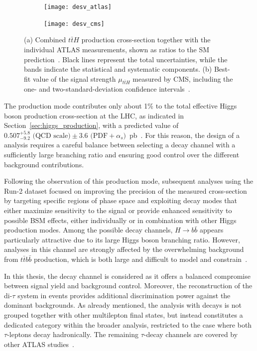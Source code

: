 \begin{figure}[htbp]
    \centering
    \begin{subfigure}[b]{0.48\textwidth}
        \texttt{[image: desv\_atlas]}
        \caption{}
    \end{subfigure}
    \hfill
    \begin{subfigure}[b]{0.48\textwidth}
        \texttt{[image: desv\_cms]}
        \caption{}
    \end{subfigure}
    \hfill
    \caption{(a) Combined $t\bar{t}H$ production cross-section together with the individual ATLAS measurements, shown as ratios to the SM prediction~\cite{ATLAS:2018mme}. Black lines represent the total uncertainties, while the bands indicate the statistical and systematic components. (b) Best-fit value of the signal strength $\mu_{t\bar{t}H}$ measured by CMS, including the one- and two-standard-deviation confidence intervals~\cite{CMS:2018uxb}.}
    \label{fig:tth_obs}
  \end{figure}

  The \ttH production mode contributes only about 1\% to the total effective Higgs boson production cross-section at the LHC, as indicated in Section~\ref{sec:higgs_production}, with a predicted value of $0.507^{+5.8}_{-9.2} \text{ (QCD scale)} \pm 3.6 \text{ (PDF}+\alpha_{s})$~pb~\cite{https://doi.org/10.23731/cyrm-2017-002}. For this reason, the design of a \ttH analysis requires a careful balance between selecting a decay channel with a sufficiently large branching ratio and ensuring good control over the different background contributions.  

  Following the observation of this production mode, subsequent analyses using the Run-2 dataset focused on improving the precision of the measured cross-section by targeting specific regions of phase space and exploiting decay modes that either maximize sensitivity to the signal or provide enhanced sensitivity to possible BSM effects, either individually or in combination with other Higgs production modes. Among the possible decay channels, $H \to b\bar{b}$ appears particularly attractive due to its large Higgs boson branching ratio. However, \ttH analyses in this channel are strongly affected by the overwhelming background from $t\bar{t}b\bar{b}$ production, which is both large and difficult to model and constrain~\cite{Aad:2904447}.  
  
  In this thesis, the \htautau decay channel is considered as it offers a balanced compromise between signal yield and background control. Moreover, the reconstruction of the di-$\tau$ system in \htautau events provides additional discrimination power against the dominant backgrounds. As already mentioned, the \ttH analysis with \htautau decays is not grouped together with other multilepton final states, but instead constitutes a dedicated category within the broader \htautau analysis, restricted to the case where both $\tau$-leptons decay hadronically. The remaining $\tau$-decay channels are covered by other ATLAS studies~\cite{PhysRevD.97.072003}.  
  
